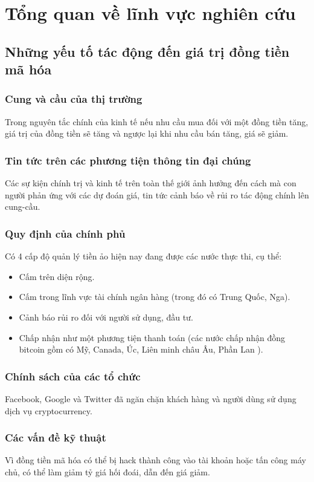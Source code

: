 \chapter{Tổng quan về lĩnh vực nghiên cứu} 
\section{Những yếu tố tác động đến giá trị đồng tiền mã hóa} \label{overview:factor}
\subsection{Cung và cầu của thị trường}
Trong nguyên tắc chính của kinh tế nếu nhu cầu mua đối với một đồng tiền tăng, giá trị của đồng tiền sẽ tăng và ngược lại khi nhu cầu bán tăng, giá sẽ giảm.
\subsection{Tin tức trên các phương tiện thông tin đại chúng}
Các sự kiện chính trị và kinh tế trên toàn thế giới ảnh hưởng đến cách mà con người phản ứng với các dự đoán giá, tin tức cảnh báo về rủi ro tác động chính lên cung-cầu.
\subsection{Quy định của chính phủ}
Có 4 cấp độ quản lý tiền ảo hiện nay đang được các nước thực thi, cụ thể:
\begin{itemize}
\item Cấm trên diện rộng.
\item Cấm trong lĩnh vực tài chính ngân hàng (trong đó có Trung Quốc, Nga).
\item Cảnh báo rủi ro đối với người sử dụng, đầu tư.
\item  Chấp nhận như một phương tiện thanh toán (các nước chấp nhận đồng bitcoin gồm có Mỹ, Canada, Úc, Liên minh châu Âu, Phần Lan \cite{CountriesAllowBTC} ).
\end{itemize}
\subsection{Chính sách của các tổ chức}
Facebook, Google và Twitter đã ngăn chặn khách hàng và người dùng sử dụng dịch vụ cryptocurrency.
\subsection{Các vấn đề kỹ thuật}
Vì đồng tiền mã hóa có thể bị hack thành công vào tài khoản hoặc tấn công máy chủ, có thể làm giảm tỷ giá hối đoái, dẫn đến giá giảm.
